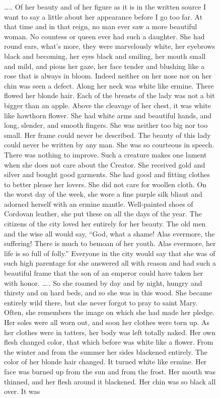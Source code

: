 \documentclass[
  letterpaper,
  DIV=11,
  numbers=noendperiod,
  oneside]{scrreprt}
\begin{document}
\begin{figure}
\ldots.. Of her beauty and of her figure as it is in the written source
I want to say a little about her appearance before I go too far. At that
time and in that reign, no man ever saw a more beautiful woman. No
countess or queen ever had such a daughter. She had round ears, what's
more, they were marvelously white, her eyebrows black and becoming, her
eyes black and smiling, her mouth small and mild, and pious her gaze,
her face tender and blushing like a rose that is always in bloom. Indeed
neither on her nose nor on her chin was seen a defect. Along her neck
was white like ermine. There flowed her blonde hair. Each of the breasts
of the lady was not a bit bigger than an apple. Above the cleavage of
her chest, it was white like hawthorn flower. She had white arms and
beautiful hands, and long, slender, and smooth fingers. She was neither
too big nor too small. Her frame could never be described. The beauty of
this lady could never be written by any man. She was so courteous in
speech. There was nothing to improve. Such a creature makes one lament
when she does not care about the Creator. She received gold and silver
and bought good garments. She had good and fitting clothes to better
please her lovers. She did not care for woollen cloth. On the worst day
of the week, she wore a fine purple silk bliaut and adorned herself with
an ermine mantle. Well-painted shoes of Cordovan leather, she put these
on all the days of the year. The citizens of the city loved her entirely
for her beauty. The old men and the wise all would say, ``God, what a
shame! Alas evermore, the suffering! There is much to bemoan of her
youth. Alas evermore, her life is so full of folly.'' Everyone in the
city would say that she was of such high parentage for she answered all
with reason and had such a beautiful frame that the son of an emperor
could have taken her with honor. \ldots.. So she roamed by day and by
night, hungry and thirsty and on hard beds, and so she was in this wood.
She became entirely wild there, but she never forgot to pray to saint
Mary. Often, she remembers the image on which she had made her pledge.
Her soles were all worn out, and soon her clothes were torn up. As her
clothes were in tatters, her body was left totally naked. Her own flesh
changed color, that which before was white like a flower. From the
winter and from the summer her sides blackened entirely. The color of
her blonde hair changed. It turned white like ermine. Her face was
burned up from the sun and from the frost. Her mouth was thinned, and
her flesh around it blackened. Her chin was so black all over. It was

\end{figure}
\end{document}
